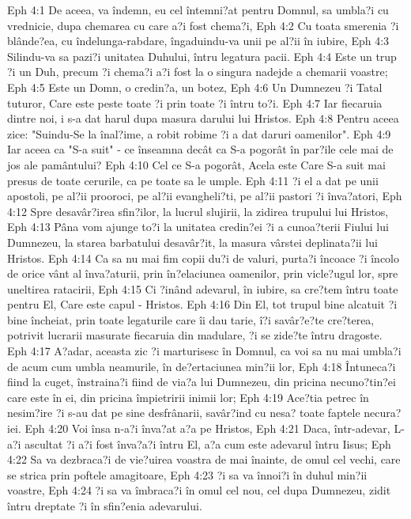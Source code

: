 Eph 4:1  De aceea, va îndemn, eu cel întemni?at pentru Domnul, sa umbla?i cu vrednicie, dupa chemarea cu care a?i fost chema?i,
Eph 4:2  Cu toata smerenia ?i blânde?ea, cu îndelunga-rabdare, îngaduindu-va unii pe al?ii în iubire,
Eph 4:3  Silindu-va sa pazi?i unitatea Duhului, întru legatura pacii.
Eph 4:4  Este un trup ?i un Duh, precum ?i chema?i a?i fost la o singura nadejde a chemarii voastre;
Eph 4:5  Este un Domn, o credin?a, un botez,
Eph 4:6  Un Dumnezeu ?i Tatal tuturor, Care este peste toate ?i prin toate ?i întru to?i.
Eph 4:7  Iar fiecaruia dintre noi, i s-a dat harul dupa masura darului lui Hristos.
Eph 4:8  Pentru aceea zice: "Suindu-Se la înal?ime, a robit robime ?i a dat daruri oamenilor".
Eph 4:9  Iar aceea ca "S-a suit" - ce înseamna decât ca S-a pogorât în par?ile cele mai de jos ale pamântului?
Eph 4:10  Cel ce S-a pogorât, Acela este Care S-a suit mai presus de toate cerurile, ca pe toate sa le umple.
Eph 4:11  ?i el a dat pe unii apostoli, pe al?ii prooroci, pe al?ii evangheli?ti, pe al?ii pastori ?i înva?atori,
Eph 4:12  Spre desavâr?irea sfin?ilor, la lucrul slujirii, la zidirea trupului lui Hristos,
Eph 4:13  Pâna vom ajunge to?i la unitatea credin?ei ?i a cunoa?terii Fiului lui Dumnezeu, la starea barbatului desavâr?it, la masura vârstei deplinata?ii lui Hristos.
Eph 4:14  Ca sa nu mai fim copii du?i de valuri, purta?i încoace ?i încolo de orice vânt al înva?aturii, prin în?elaciunea oamenilor, prin vicle?ugul lor, spre uneltirea ratacirii,
Eph 4:15  Ci ?inând adevarul, în iubire, sa cre?tem întru toate pentru El, Care este capul - Hristos.
Eph 4:16  Din El, tot trupul bine alcatuit ?i bine încheiat, prin toate legaturile care îi dau tarie, î?i savâr?e?te cre?terea, potrivit lucrarii masurate fiecaruia din madulare, ?i se zide?te întru dragoste.
Eph 4:17  A?adar, aceasta zic ?i marturisesc în Domnul, ca voi sa nu mai umbla?i de acum cum umbla neamurile, în de?ertaciunea min?ii lor,
Eph 4:18  Întuneca?i fiind la cuget, înstraina?i fiind de via?a lui Dumnezeu, din pricina necuno?tin?ei care este în ei, din pricina împietririi inimii lor;
Eph 4:19  Ace?tia petrec în nesim?ire ?i s-au dat pe sine desfrânarii, savâr?ind cu nesa? toate faptele necura?iei.
Eph 4:20  Voi însa n-a?i înva?at a?a pe Hristos,
Eph 4:21  Daca, într-adevar, L-a?i ascultat ?i a?i fost înva?a?i întru El, a?a cum este adevarul întru Iisus;
Eph 4:22  Sa va dezbraca?i de vie?uirea voastra de mai înainte, de omul cel vechi, care se strica prin poftele amagitoare,
Eph 4:23  ?i sa va înnoi?i în duhul min?ii voastre,
Eph 4:24  ?i sa va îmbraca?i în omul cel nou, cel dupa Dumnezeu, zidit întru dreptate ?i în sfin?enia adevarului.
